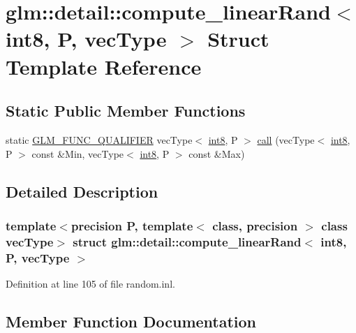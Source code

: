 \hypertarget{structglm_1_1detail_1_1compute__linear_rand_3_01int8_00_01_p_00_01vec_type_01_4}{}\section{glm\+::detail\+::compute\+\_\+linear\+Rand$<$ int8, P, vec\+Type $>$ Struct Template Reference}
\label{structglm_1_1detail_1_1compute__linear_rand_3_01int8_00_01_p_00_01vec_type_01_4}
\subsection*{Static Public Member Functions}
\begin{DoxyCompactItemize}
\item 
static \mbox{\hyperlink{setup_8hpp_a33fdea6f91c5f834105f7415e2a64407}{G\+L\+M\+\_\+\+F\+U\+N\+C\+\_\+\+Q\+U\+A\+L\+I\+F\+I\+ER}} vec\+Type$<$ \mbox{\hyperlink{namespaceglm_1_1detail_a04b526a8d7a9b455602a0afa78c531e0}{int8}}, P $>$ \mbox{\hyperlink{structglm_1_1detail_1_1compute__linear_rand_3_01int8_00_01_p_00_01vec_type_01_4_a0ce1c78af3d0d236a2bf50646d60bc8b}{call}} (vec\+Type$<$ \mbox{\hyperlink{namespaceglm_1_1detail_a04b526a8d7a9b455602a0afa78c531e0}{int8}}, P $>$ const \&Min, vec\+Type$<$ \mbox{\hyperlink{namespaceglm_1_1detail_a04b526a8d7a9b455602a0afa78c531e0}{int8}}, P $>$ const \&Max)
\end{DoxyCompactItemize}


\subsection{Detailed Description}
\subsubsection*{template$<$precision P, template$<$ class, precision $>$ class vec\+Type$>$\newline
struct glm\+::detail\+::compute\+\_\+linear\+Rand$<$ int8, P, vec\+Type $>$}



Definition at line 105 of file random.\+inl.



\subsection{Member Function Documentation}
\mbox{\label{structglm_1_1detail_1_1compute__linear_rand_3_01int8_00_01_p_00_01vec_type_01_4_a0ce1c78af3d0d236a2bf50646d60bc8b}} 

